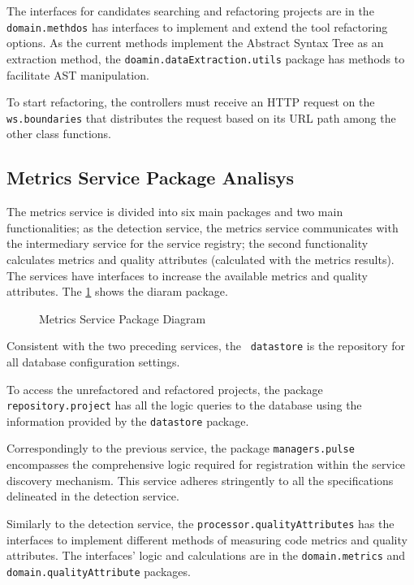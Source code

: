The interfaces for candidates searching and refactoring projects are in the \texttt{domain.methdos} has interfaces to implement and extend the tool refactoring options. As the current methods implement the Abstract Syntax Tree as an extraction method, the \texttt{doamin.dataExtraction.utils} package has methods to facilitate AST manipulation.

To start refactoring, the controllers must receive an HTTP request on the \texttt{ws.boundaries} that distributes the request based on its URL path among the other class functions. 

\subsection{Metrics Service Package Analisys}

The metrics service is divided into six main packages and two main functionalities; as the detection service, the metrics service communicates with the intermediary service for the service registry; the second functionality calculates metrics and quality attributes (calculated with the metrics results). The services have interfaces to increase the available metrics and quality attributes. The \cref{fig-package-metrics} shows the diaram package.

\begin{figure}[ht!]
\SetCaptionWidth{\textwidth}
\caption{Metrics Service Package Diagram}
\label{fig-package-metrics}
\fontsize{9}{10}\selectfont

\end{figure}
\FloatBarrier

Consistent with the two preceding services, the \texttt{ datastore} is the repository for all database configuration settings.

To access the unrefactored and refactored projects, the package \texttt{repository.project} has all the logic queries to the database using the information provided by the \texttt{datastore} package.

Correspondingly to the previous service, the package \texttt{managers.pulse} encompasses the comprehensive logic required for registration within the service discovery mechanism. This service adheres stringently to all the specifications delineated in the detection service.

Similarly to the detection service, the \texttt{processor.qualityAttributes} has the interfaces to implement different methods of measuring code metrics and quality attributes. The interfaces' logic and calculations are in the \texttt{domain.metrics} and \texttt{domain.qualityAttribute} packages.

